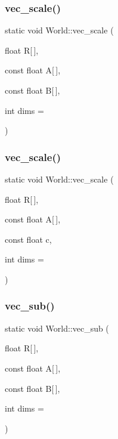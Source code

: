 \mbox{\label{classWorld_a70a8d815c805c5e20d5374384ae3d5c2}} 
\subsubsection{\texorpdfstring{vec\+\_\+scale()}{vec\_scale()}\hspace{0.1cm}{\footnotesize\ttfamily [1/2]}}
{\footnotesize\ttfamily static void World\+::vec\+\_\+scale (\begin{DoxyParamCaption}\item[{float}]{R\mbox{[}$\,$\mbox{]},  }\item[{const float}]{A\mbox{[}$\,$\mbox{]},  }\item[{const float}]{B\mbox{[}$\,$\mbox{]},  }\item[{int}]{dims = {} }\end{DoxyParamCaption})\hspace{0.3cm}{\ttfamily [static]}}

\mbox{\label{classWorld_ab78807c00ae11c6ddf732a2d1b5ab89d}} 
\subsubsection{\texorpdfstring{vec\+\_\+scale()}{vec\_scale()}\hspace{0.1cm}{\footnotesize\ttfamily [2/2]}}
{\footnotesize\ttfamily static void World\+::vec\+\_\+scale (\begin{DoxyParamCaption}\item[{float}]{R\mbox{[}$\,$\mbox{]},  }\item[{const float}]{A\mbox{[}$\,$\mbox{]},  }\item[{const float}]{c,  }\item[{int}]{dims = {} }\end{DoxyParamCaption})\hspace{0.3cm}{\ttfamily [static]}}

\mbox{\label{classWorld_aae347e6c500ccb406b5344c0e02c4c83}} 
\subsubsection{\texorpdfstring{vec\+\_\+sub()}{vec\_sub()}}
{\footnotesize\ttfamily static void World\+::vec\+\_\+sub (\begin{DoxyParamCaption}\item[{float}]{R\mbox{[}$\,$\mbox{]},  }\item[{const float}]{A\mbox{[}$\,$\mbox{]},  }\item[{const float}]{B\mbox{[}$\,$\mbox{]},  }\item[{int}]{dims = {} }\end{DoxyParamCaption})\hspace{0.3cm}{\ttfamily [static]}}

